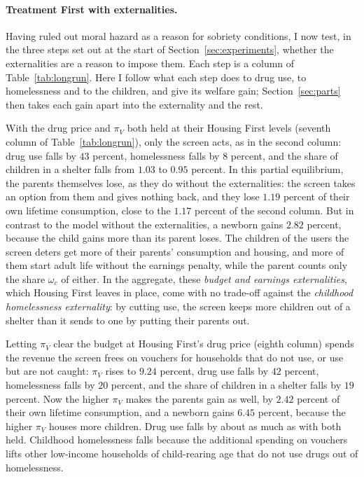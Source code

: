 \documentclass[10pt]{article}
\begin{document}
\paragraph{Treatment First with externalities.} Having ruled out moral hazard as a reason for sobriety conditions, I now test, in the three steps set out at the start of Section~\ref{sec:experiments}, whether the externalities are a reason to impose them. Each step is a column of Table~\ref{tab:longrun}. Here I follow what each step does to drug use, to homelessness and to the children, and give its welfare gain; Section~\ref{sec:parts} then takes each gain apart into the externality and the rest.

With the drug price and $\pi_V$ both held at their Housing First levels (seventh column of Table~\ref{tab:longrun}), only the screen acts, as in the second column: drug use falls by $43$ percent, homelessness falls by $8$ percent, and the share of children in a shelter falls from $1.03$ to $0.95$ percent. In this partial equilibrium, the parents themselves lose, as they do without the externalities: the screen takes an option from them and gives nothing back, and they lose $1.19$ percent of their own lifetime consumption, close to the $1.17$ percent of the second column. But in contrast to the model without the externalities, a newborn gains $2.82$ percent, because the child gains more than its parent loses. The children of the users the screen deters get more of their parents' consumption and housing, and more of them start adult life without the earnings penalty, while the parent counts only the share $\omega_c$ of either. In the aggregate, these \emph{budget and earnings externalities}, which Housing First leaves in place, come with no trade-off against the \emph{childhood homelessness externality}: by cutting use, the screen keeps more children out of a shelter than it sends to one by putting their parents out.

Letting $\pi_V$ clear the budget at Housing First's drug price (eighth column) spends the revenue the screen frees on vouchers for households that do not use, or use but are not caught: $\pi_V$ rises to $9.24$ percent, drug use falls by $42$ percent, homelessness falls by $20$ percent, and the share of children in a shelter falls by $19$ percent. Now the higher $\pi_V$ makes the parents gain as well, by $2.42$ percent of their own lifetime consumption, and a newborn gains $6.45$ percent, because the higher $\pi_V$ houses more children. Drug use falls by about as much as with both held. Childhood homelessness falls because the additional spending on vouchers lifts other low-income households of child-rearing age that do not use drugs out of homelessness.
\end{document}

